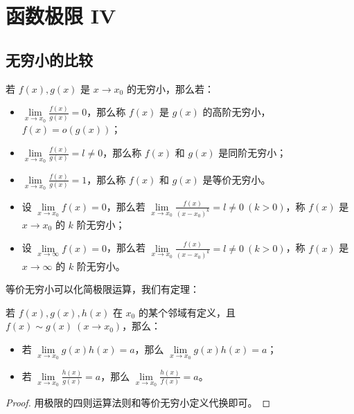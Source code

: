 \section{函数极限 IV}

\subsection{无穷小的比较}

\begin{definition}[无穷小的比较]
	若 $f(x),g(x)$ 是 $x \to x_0$ 的无穷小，那么若：
	\begin{itemize}
		\item $\lim\limits_{x \to x_0} \frac{f(x)}{g(x)} = 0$，那么称 $f(x)$ 是 $g(x)$ 的高阶无穷小，$f(x) = o(g(x))$；
		\item $\lim\limits_{x \to x_0} \frac{f(x)}{g(x)} = l \neq 0$，那么称 $f(x)$ 和 $g(x)$ 是同阶无穷小；
		\item $\lim\limits_{x \to x_0} \frac{f(x)}{g(x)} = 1$，那么称 $f(x)$ 和 $g(x)$ 是等价无穷小。
	\end{itemize}
\end{definition}

\begin{definition}[无穷小的阶]
	\begin{itemize}
		\item 设 $\lim\limits_{x \to x_0} f(x) = 0$，那么若 $\lim\limits_{x \to x_0} \frac{f(x)}{(x - x_0)^k} = l \neq 0\ (k > 0)$，称 $f(x)$ 是 $x \to x_0$ 的 $k$ 阶无穷小；
		\item 设 $\lim\limits_{x \to \infty} f(x) = 0$，那么若 $\lim\limits_{x \to x_0} \frac{f(x)}{(x - x_0)^k} = l \neq 0\ (k > 0)$，称 $f(x)$ 是 $x \to \infty$ 的 $k$ 阶无穷小。
	\end{itemize}
\end{definition}

等价无穷小可以化简极限运算，我们有定理：

\begin{theorem}[等价代换定理]
	若 $f(x),g(x),h(x)$ 在 $x_0$ 的某个邻域有定义，且 $f(x) \sim g(x)\ (x \to x_0)$，那么：
	
	\begin{itemize}
		\item 若 $\lim\limits_{x \to x_0} g(x) h(x) = a$，那么 $\lim\limits_{x \to x_0} g(x) h(x) = a$；
		\item 若 $\lim\limits_{x \to x_0} \frac{h(x)}{g(x)} = a$，那么 $\lim\limits_{x \to x_0} \frac{h(x)}{f(x)} = a$。
	\end{itemize}

	\begin{proof}
		用极限的四则运算法则和等价无穷小定义代换即可。
	\end{proof}
\end{theorem}

